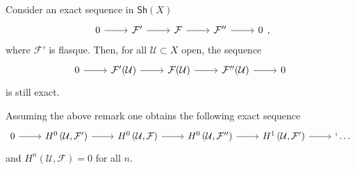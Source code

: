 \documentclass[../Main]{subfiles}
\begin{document}
\begin{prop}[]
	Consider an exact sequence in $\mathsf{Sh}\left(X\right)$
	\begin{equation}
	\begin{tikzcd}
		0 \arrow[r, "", rightarrow] &
		\mathcal{F}' \arrow[r, "", rightarrow] &
		\mathcal{F} \arrow[r, "", rightarrow] &
		\mathcal{F}'' \arrow[r, "", rightarrow] &
		0
	\end{tikzcd}
	,\end{equation} 
	where $\mathcal{F}'$ is flasque.
	Then, for all $\mathcal{U} \subset X$ open, the sequence
	\begin{equation}
	\begin{tikzcd}
		0 \arrow[r, "", rightarrow] &
		\mathcal{F}'(\mathcal{U}) \arrow[r, "", rightarrow] &
		\mathcal{F}(\mathcal{U}) \arrow[r, "", rightarrow] &
		\mathcal{F}''(\mathcal{U}) \arrow[r, "", rightarrow] &
		0
	\end{tikzcd}
	\end{equation} 
	is still exact.
\end{prop}

\begin{rem}
	Assuming the above remark one obtains the following exact sequence
	\begin{equation}
	\begin{tikzcd}
		0 \arrow[r, "", rightarrow] &
		H^{0} \left( \mathcal{U}, \mathcal{F}' \right) \arrow[r, "", rightarrow] &
		H^{0} \left( \mathcal{U}, \mathcal{F} \right) \arrow[r, "", rightarrow] &
		H^{0} \left( \mathcal{U}, \mathcal{F}'' \right) \arrow[r, "", rightarrow] & 
		H^{1} \left( \mathcal{U}, \mathcal{F}' \right) \arrow[r, "", rightarrow] &`
		\ldots
	\end{tikzcd}
	\end{equation} 
	and $H^{n} \left( \mathcal{U}, \mathcal{F} \right) = 0$ for all $n$.
\end{rem}
\end{document}
